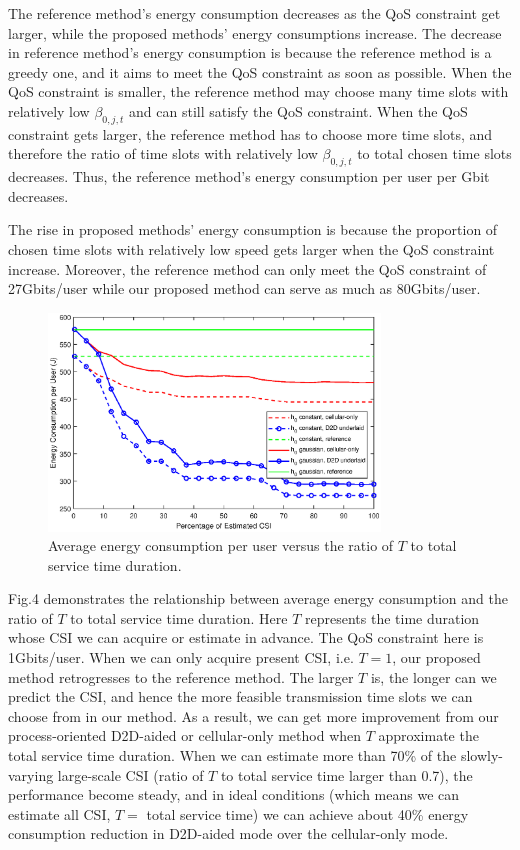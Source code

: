 \documentclass{ieeeaccess}
\begin{document}
The reference method's energy consumption decreases as the QoS constraint get larger, while the proposed methods' energy consumptions increase. The decrease in reference method's energy consumption is because the reference method is a greedy one, and it aims to meet the QoS constraint as soon as possible. When the QoS constraint is smaller, the reference method may choose many time slots with relatively low ${\beta _{0,j,t}}$ and can still satisfy the QoS constraint. When the QoS constraint gets larger, the reference method has to choose more time slots, and therefore the ratio of time slots with relatively low ${\beta _{0,j,t}}$ to total chosen time slots decreases. Thus, the reference method's energy consumption per user per Gbit decreases.

The rise in proposed methods' energy consumption is because the proportion of chosen time slots with relatively low speed gets larger when the QoS constraint increase. Moreover, the reference method can only meet the QoS constraint of 27Gbits/user while our proposed method can serve as much as 80Gbits/user.

\begin{figure} [htb]
\includegraphics*[width=8.8cm]{Tranges.eps}
\caption{Average energy consumption per user versus the ratio of $T$ to total service time duration.} \label{fig:4}
\end{figure}




Fig.4 demonstrates the relationship between average energy consumption and the ratio of $T$ to total service time duration. Here $T$ represents the time duration whose CSI we can acquire or estimate in advance. The QoS constraint here is 1Gbits/user. 
When we can only acquire present CSI, i.e. $T = 1$, our proposed method retrogresses to the reference method. The larger $T$ is, the longer can we predict the CSI, and hence the more feasible transmission time slots we can choose from in our method. As a result, we can get more improvement from our process-oriented D2D-aided or cellular-only method when $T$ approximate the total service time duration. When we can estimate more than 70\% of the slowly-varying large-scale CSI (ratio of $T$ to total service time larger than 0.7), the performance become steady, and in ideal conditions (which means we can estimate all CSI, $T=$ total service time) we can achieve about 40\% energy consumption reduction in D2D-aided mode over the cellular-only mode.
\end{document}
